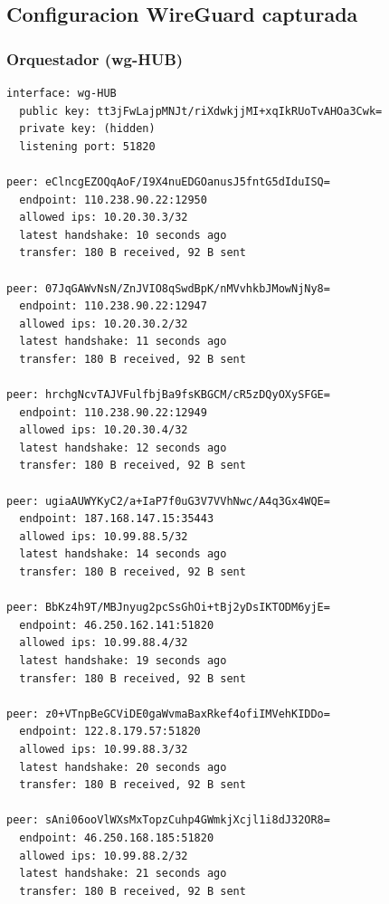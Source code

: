 \documentclass[11pt,a4paper]{article}
\begin{document}
\subsection{Configuracion WireGuard capturada}
\subsubsection*{Orquestador (wg-HUB)}
\begin{lstlisting}
interface: wg-HUB
  public key: tt3jFwLajpMNJt/riXdwkjjMI+xqIkRUoTvAHOa3Cwk=
  private key: (hidden)
  listening port: 51820

peer: eClncgEZOQqAoF/I9X4nuEDGOanusJ5fntG5dIduISQ=
  endpoint: 110.238.90.22:12950
  allowed ips: 10.20.30.3/32
  latest handshake: 10 seconds ago
  transfer: 180 B received, 92 B sent

peer: 07JqGAWvNsN/ZnJVIO8qSwdBpK/nMVvhkbJMowNjNy8=
  endpoint: 110.238.90.22:12947
  allowed ips: 10.20.30.2/32
  latest handshake: 11 seconds ago
  transfer: 180 B received, 92 B sent

peer: hrchgNcvTAJVFulfbjBa9fsKBGCM/cR5zDQyOXySFGE=
  endpoint: 110.238.90.22:12949
  allowed ips: 10.20.30.4/32
  latest handshake: 12 seconds ago
  transfer: 180 B received, 92 B sent

peer: ugiaAUWYKyC2/a+IaP7f0uG3V7VVhNwc/A4q3Gx4WQE=
  endpoint: 187.168.147.15:35443
  allowed ips: 10.99.88.5/32
  latest handshake: 14 seconds ago
  transfer: 180 B received, 92 B sent

peer: BbKz4h9T/MBJnyug2pcSsGhOi+tBj2yDsIKTODM6yjE=
  endpoint: 46.250.162.141:51820
  allowed ips: 10.99.88.4/32
  latest handshake: 19 seconds ago
  transfer: 180 B received, 92 B sent

peer: z0+VTnpBeGCViDE0gaWvmaBaxRkef4ofiIMVehKIDDo=
  endpoint: 122.8.179.57:51820
  allowed ips: 10.99.88.3/32
  latest handshake: 20 seconds ago
  transfer: 180 B received, 92 B sent

peer: sAni06ooVlWXsMxTopzCuhp4GWmkjXcjl1i8dJ32OR8=
  endpoint: 46.250.168.185:51820
  allowed ips: 10.99.88.2/32
  latest handshake: 21 seconds ago
  transfer: 180 B received, 92 B sent

\end{lstlisting}
\end{document}
